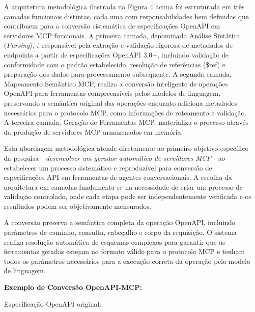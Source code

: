\documentclass[
]{article}
\begin{document}
A arquitetura metodológica ilustrada na Figura 4 acima foi estruturada
em três camadas funcionais distintas, cada uma com responsabilidades bem
definidas que contribuem para a conversão sistemática de especificações
OpenAPI em servidores MCP funcionais. A primeira camada, denominada
Análise Sintática (\emph{Parsing}), é responsável pela extração e
validação rigorosa de metadados de endpoints a partir de especificações
OpenAPI 3.0+, incluindo validação de conformidade com o padrão
estabelecido, resolução de referências (\$ref) e preparação dos dados
para processamento subsequente. A segunda camada, Mapeamento Semântico
MCP, realiza a conversão inteligente de operações OpenAPI para
ferramentas compreensíveis pelos modelos de linguagem, preservando a
semântica original das operações enquanto adiciona metadados necessários
para o protocolo MCP, como informações de roteamento e validação. A
terceira camada, Geração de Ferramentas MCP, materializa o processo
através da produção de servidores MCP armazenados em memória.

Esta abordagem metodológica atende diretamente ao primeiro objetivo
específico da pesquisa - \emph{desenvolver um gerador automático de
servidores MCP} - ao estabelecer um processo sistemático e reproduzível
para conversão de especificações API em ferramentas de agentes
conversacionais. A escolha da arquitetura em camadas fundamenta-se na
necessidade de criar um processo de validação controlado, onde cada
etapa pode ser independentemente verificada e os resultados podem ser
objetivamente mensurados.

A conversão preserva a semântica completa da operação OpenAPI, incluindo
parâmetros de caminho, consulta, cabeçalho e corpo da requisição. O
sistema realiza resolução automática de esquemas complexos para garantir
que as ferramentas geradas estejam no formato válido para o protocolo
MCP e tenham todos os parâmetros necessários para a execução correta da
operação pelo modelo de linguagem.

\textbf{Exemplo de Conversão OpenAPI-MCP:}

Especificação OpenAPI original:
\end{document}
